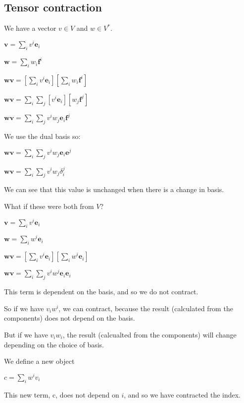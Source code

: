 
\subsection{Tensor contraction}

We have a vector \(v\in V\) and \(w\in V^*\).

\(\mathbf v=\sum_i v^i \mathbf e_i\)

\(\mathbf w=\sum_i w_i \mathbf f^i\)

\(\mathbf w\mathbf v=[\sum_i v^i \mathbf e_i][\sum_i w_i \mathbf f^i]\)

\(\mathbf w\mathbf v=\sum_i \sum_j [v^i \mathbf e_i][w_j \mathbf f^j]\)

\(\mathbf w\mathbf v=\sum_i \sum_j v^i w_j \mathbf e_i\mathbf f^j\)

We use the dual basis so:

\(\mathbf w\mathbf v=\sum_i \sum_j v^i w_j \mathbf e_i\mathbf e^j\)

\(\mathbf w\mathbf v=\sum_i \sum_j v^i w_j \delta_i^j\)

We can see that this value is unchanged when there is a change in basis.

What if these were both from \(V\)?

\(\mathbf v=\sum_i v^i \mathbf e_i\)

\(\mathbf w=\sum_i w^i \mathbf e_i\)

\(\mathbf w\mathbf v=[\sum_i v^i \mathbf e_i][\sum_i w^i \mathbf e_i]\)

\(\mathbf w\mathbf v=\sum_i \sum_j v^i w^j \mathbf e_i\mathbf e_i\)

This term is dependent on the basis, and so we do not contract.

So if we have \(v_iw^i\), we can contract, because the result (calculated from the components) does not depend on the basis.

But if we have \(v_iw_i\), the result (calcualted from the components) will change depending on the choice of basis.

We define a new object

\(c=\sum_i w^iv_i\)

This new term, c, does not depend on \(i\), and so we have contracted the index.

